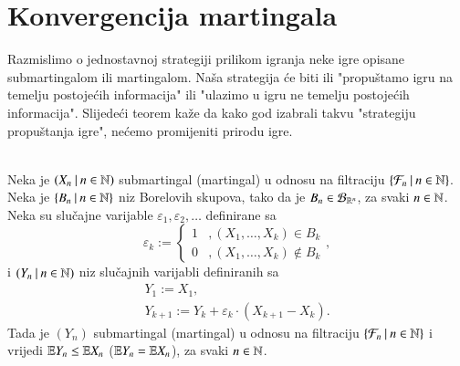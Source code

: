 
\chapter{Konvergencija martingala}

Razmislimo o jednostavnoj strategiji prilikom igranja neke igre opisane submartingalom ili martingalom.
Na\v sa strategija \'ce biti ili "propu\v stamo igru na temelju postoje\' cih informacija" ili "ulazimo u igru ne temelju postoje\' cih informacija".
Slijede\' ci teorem ka\v ze da kako god izabrali takvu "strategiju propu\v stanja igre", ne\' cemo promijeniti prirodu igre.

\begin{tm}  \label{tm:24.1}
    \quad \\
    Neka je $({X_n} \: | \: {n \in \mathbb{N}})$ submartingal (martingal) u odnosu na filtraciju $\{{\mathcal{F}_n} \: | \: {n \in \mathbb{N}}\}$.
    Neka je $\{{B_n} \: | \: {n \in \mathbb{N}}\}$ niz Borelovih skupova, tako da je $B_n \in \mathcal{B}_{\mathbb{R}^n}$, za svaki $n \in \mathbb{N}$.
    Neka su slu\v cajne varijable $\varepsilon_1, \varepsilon_2, \ldots$ definirane sa
    \begin{equation*}
        \varepsilon_k :=
        \begin{cases}
            1 &, (X_1, \ldots, X_k) \in B_k\\
            0 &, (X_1, \ldots, X_k) \notin B_k
        \end{cases},
    \end{equation*}
    i $({Y_n} \: | \: {n \in \mathbb{N}})$ niz slu\v cajnih varijabli definiranih sa
    \begin{equation*}
        \begin{gathered}
            Y_1 := X_1,\\
            Y_{k + 1} := Y_k + \varepsilon_k \cdot (X_{k + 1} - X_k).
        \end{gathered}
    \end{equation*}
    Tada je $(Y_n)$ submartingal (martingal) u odnosu na filtraciju $\{{\mathcal{F}_n} \: | \: {n \in \mathbb{N}}\}$ i vrijedi $\mathbb{E} Y_n \leq \mathbb{E} X_n$ ($\mathbb{E} Y_n = \mathbb{E} X_n$), za svaki $n \in \mathbb{N}$.
\end{tm}

